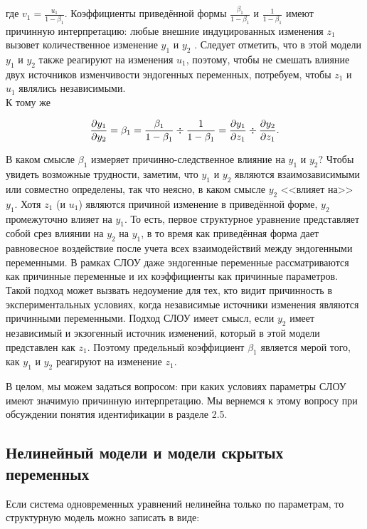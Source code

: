 где $v_{1}=\frac{u_{1}}{1-\beta_{1}}$. Коэффициенты приведённой формы $\frac{\beta_{1}}{1-\beta_{1}}$ и $\frac{1}{1-\beta_{1}}$  имеют причинную интерпретацию: любые внешние индуцированных изменения $z_{1}$ вызовет количественное изменение $y_{1}$ и $y_{2}$ . Следует отметить, что в этой модели $y_{1}$ и $y_{2}$ также реагируют на изменения $u_{1}$, поэтому, чтобы не смешать влияние двух источников изменчивости эндогенных переменных, потребуем, чтобы $z_{1}$ и $u_{1}$ являлись независимыми. \\
	К тому же

\[
\frac{\partial y_{1}}{\partial y_{2}}=\beta_{1}=\frac{\beta_{1}}{1-\beta_{1}}\div\frac{1}{1-\beta_{1}} \\
=\frac{\partial y_{1}}{\partial z_{1}}\div\frac{\partial y_{2}}{\partial z_{1}}.
\]


В каком смысле $\beta_{1}$ измеряет причинно-следственное влияние на $y_{1}$ и $y_{2}$? Чтобы увидеть возможные трудности, заметим, что $y_{1}$ и $y_{2}$ являются взаимозависимыми или совместно определены, так что неясно, в каком смысле $y_{2}$ <<влияет на>> $y_{1}$. Хотя $z_{1}$ (и $u_{1}$) являются причиной изменение в приведённой форме, $y_{2}$ промежуточно влияет на $y_{1}$. То есть, первое структурное уравнение представляет собой срез влиянии на $y_{2}$ на  $y_{1}$, в то время как приведённая форма дает равновесное воздействие после учета всех взаимодействий  между эндогенными переменными. В рамках СЛОУ даже эндогенные переменные рассматриваются как причинные переменные и их коэффициенты как причинные параметров. Такой подход может вызвать недоумение для тех, кто видит причинность в экспериментальных условиях, когда независимые источники изменения являются причинными переменными. Подход СЛОУ имеет смысл, если $y_{2}$ имеет независимый и экзогенный источник изменений, который в этой модели представлен как $z_{1}$. Поэтому предельный коэффициент $\beta_{1}$ является мерой того, как $y_{1}$ и $y_{2}$ реагируют на изменение $z_{1}$. 


	В целом, мы можем задаться вопросом: при каких условиях параметры СЛОУ имеют значимую причинную интерпретацию. Мы вернемся к этому вопросу при обсуждении понятия идентификации в разделе 2.5.

\subsection{Нелинейный модели и модели скрытых переменных}


Если система одновременных уравнений нелинейна только по параметрам, то структурную модель можно записать в виде:



